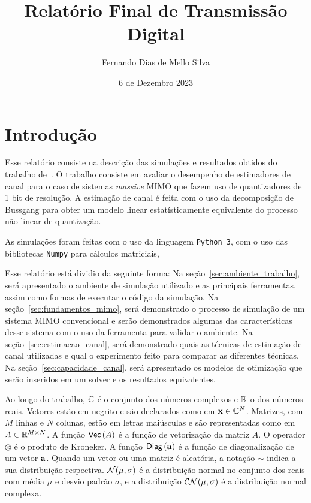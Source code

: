 \documentclass{article}
\title{Relatório Final de Transmissão Digital}
\author{Fernando Dias de Mello Silva}
\date{6 de Dezembro 2023}
\begin{document}
\maketitle

\section{Introdução}

Esse relatório consiste na descrição das simulações e resultados obtidos do trabalho de~\cite{li.etal_2017a}. O trabalho consiste em avaliar o desempenho de estimadores de canal para o caso de sistemas \textit{massive} MIMO que fazem uso de quantizadores de 1 bit de resolução. A estimação de canal é feita com o uso da decomposição de Bussgang para obter um modelo linear estatísticamente equivalente do processo não linear de quantização. 

As simulações foram feitas com o uso da linguagem \texttt{Python 3}, com o uso das bibliotecas \texttt{Numpy} para cálculos matriciais, \texttt{}

Esse relatório está dividio da seguinte forma:
Na seção~\ref{sec:ambiente_trabalho}, será apresentado o ambiente de simulação utilizado e as principais ferramentas, assim como formas de executar o código da simulação.
Na seção~\ref{sec:fundamentos_mimo}, será demonstrado o processo de simulação de um sistema MIMO convencional e serão demonstrados algumas das características desse sistema com o uso da ferramenta para validar o ambiente.
Na seção~\ref{sec:estimacao_canal}, será demonstrado quais as técnicas de estimação de canal utilizadas e qual o experimento feito para comparar as diferentes técnicas.
Na seção~\ref{sec:capacidade_canal}, será apresentado os modelos de otimização que serão inseridos em um solver e os resultados equivalentes.

Ao longo do trabalho, $\mathbb{C}$ é o conjunto dos números complexos e $\mathbb{R}$ o dos números reais. Vetores estão em negrito e são declarados como em $\mathbf{x}\in\mathbb{C}^{N}$. Matrizes, com $M$ linhas e $N$ colunas, estão em letras maiúsculas e são representadas como em $A\in\mathbb{R}^{M\times N}$. A função $ \mathsf{Vec} \left( A \right) $ é a função de vetorização da matriz $A$. O operador $\otimes$ é o produto de Kroneker. A função $ \mathsf{Diag} \left( \mathbf{a} \right) $ é a função de diagonalização de um vetor $\mathbf{a}$.  Quando um vetor ou uma matriz é aleatória, a notação $\sim$ indica a sua distribuição respectiva. $\mathcal{N}(\mu,\sigma)$ é a distribuição normal no conjunto dos reais com média $\mu$ e desvio padrão $\sigma$, e a distribuição $\mathcal{C}\mathcal{N}(\mu,\sigma)$ é a distribuição normal complexa. 
\end{document}
